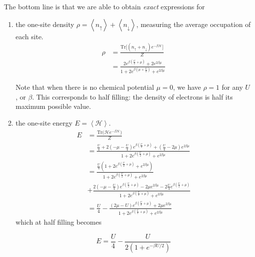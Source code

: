 \documentclass[10pt, twocolumn, twoside]{article}
\begin{document}
The bottom line is that we are able to obtain \emph{exact} expressions for

\begin{enumerate}
\item the one-site density $\rho = \left\langle n_\uparrow \right\rangle + \left\langle n_\downarrow \right\rangle$, measuring the average occupation of each site.
\begin{equation}
\begin{split}
\rho &= \frac{\text{Tr} \big[ (n_\uparrow + n_\downarrow ) e^{-\beta\mathcal{H}} \big]}{Z} \\
&= \frac{2 e^{\beta(\frac{U}{2} + \mu)} + 2 e^{2\beta\mu}}{1 + 2 e^{\beta(\mu + \frac{U}{2})} + e^{2 \beta \mu}}
\end{split}
\end{equation}

Note that when there is no chemical potential $\mu = 0$, we have $\rho = 1$ for any $U$, or $\beta$. This corresponds to half filling: the density of electrons is half its maximum possible value.

\item the one-site energy $E = \left\langle \mathcal{H} \right\rangle$.
\begin{equation}
\begin{split}
E &= \frac{\text{Tr}\bigg( \mathcal{H}e^{-\beta\mathcal{H} } \bigg)}{Z} \\
&= \frac{ \frac{U}{4} + 2 ( -\mu - \frac{U}{4} ) e^{\beta(\frac{U}{2} + \mu )} + (\frac{U}{4} - 2\mu ) e^{2\beta\mu}}{1 + 2 e^{\beta (\frac{U}{2} + \mu )} + e^{2\beta\mu} } \\
&= \frac{ \frac{U}{4} ( 1 + 2 e^{\beta (\frac{U}{2} + \mu )} + e^{2\beta\mu} )}{1 + 2 e^{\beta (\frac{U}{2} + \mu )} + e^{2\beta\mu} } \\
&+ \frac{2(-\mu - \frac{U}{4}) e^{\beta(\frac{U}{2} + \mu)} - 2\mu e^{2\beta\mu} - 2\frac{U}{4} e^{\beta (\frac{U}{2} + \mu)} }{1 + 2 e^{\beta (\frac{U}{2} + \mu )} + e^{2\beta\mu}} \\
&= \frac{U}{4} - \frac{ (2\mu - U) e^{\beta(\frac{U}{2} + \mu) } + 2\mu e^{2\beta\mu} }{1 + 2 e^{\beta (\frac{U}{2} + \mu )} + e^{2\beta\mu} }
\end{split}
\end{equation}
which at half filling becomes

\begin{equation}
E = \frac{U}{4} - \frac{U}{2 ( 1 + e^{-\beta U /2} )}
\end{equation}


\end{enumerate}
\end{document}
